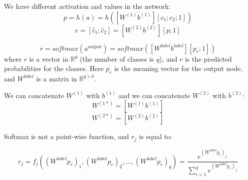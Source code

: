 \documentclass[twoside,12pt]{article}
\begin{document}
We have different activation and values in the network:
\begin{equation}
p=h(a)=h([W^{(1)} b^{(1)}][c_1;c_2;1])
\end{equation}
\begin{equation}
e=[\hat{c}_1;\hat{c}_2]=[W^{(2)} b^{(2)}][p;1]
\end{equation}

\begin{equation}
r = softmax(a^{output})=softmax([W^{label} b^{label}][p_r;1])
\end{equation}
where $r$ is a vector in $\mathbb{R}^q$ (the number of classes is $q$), and $r$ is the predicted probabilities for the classes. Here $p_r$ is the meaning vector for the output node, and $W^{label}$ is a matrix in $\mathbb{R}^{q\times d}$.

We can concatenate $W^{(1)}$ with $b^{(1)}$ and we can concatenate $W^{(2)}$ with $b^{(2)}$:
\begin{equation}
W^{(1*)}=[W^{(1)} b^{(1)}]
\end{equation}
\begin{equation}
W^{(2*)}=[W^{(2)} b^{(2)}]
\end{equation}

Softmax is not a point-wise function, and $r_j$ is equal to:

\begin{equation}
r_j=f_j((W^{label}p_r)_1,(W^{label}p_r)_2,\ldots,(W^{label}p_r)_q)=\frac{e^{(W^{label}p_r)_j}}{\sum_{i=1}^{q}e^{(W^{label}p_r)_j}}
\end{equation}
\end{document}
